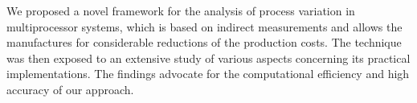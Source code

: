 We proposed a novel framework for the analysis of process variation in multiprocessor systems, which is based on indirect measurements and allows the manufactures for considerable reductions of the production costs. The technique was then exposed to an extensive study of various aspects concerning its practical implementations. The findings advocate for the computational efficiency and high accuracy of our approach.
